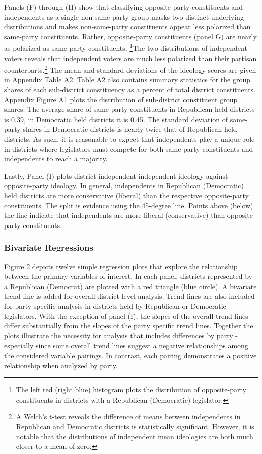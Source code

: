 \documentclass[10pt,letterpaper]{article}
\begin{document}
Panels (F) through (H) show that classifying opposite party constituents and independents as a single non-same-party group masks two distinct underlying distributions and makes non-same-party constituents appear less polarized than same-party constituents. Rather, opposite-party constituents (panel G) are nearly as polarized as same-party constituents. \footnote{The left red (right blue) histogram plots the distribution of opposite-party constituents in districts with a Republican (Democratic) legislator.}The two distributions of independent voters reveals that independent voters are much less polarized than their partisan counterparts.\footnote{A Welch's t-test reveals the difference of means between independents in Republican and Democratic districts is statistically significant. However, it is notable that the distributions of independent mean ideologies are both much closer to a mean of zero.} The mean and standard deviations of the ideology scores are given in Appendix Table A2. Table A2 also contains summary statistics for the group shares of each sub-district constituency as a percent of total district constituents. Appendix Figure A1 plots the distribution of sub-district constituent group shares. The average share of same-party constituents in Republican held districts is 0.39, in Democratic held districts it is 0.45. The standard deviation of same-party shares in Democratic districts is nearly twice that of Republican held districts. As such, it is reasonable to expect that independents play a unique role in districts where legislators must compete for both same-party constituents and independents to reach a majority.

Lastly, Panel (I) plots district independent independent ideology against opposite-party ideology. In general, independents in Republican (Democratic) held districts are more conservative (liberal) than the respective opposite-party constituents. The split is evidence using the 45-degree line. Points above (below) the line indicate that independents are more liberal (conservative) than opposite-party constituents.

\subsubsection{Bivariate Regressions}
Figure 2 depicts twelve simple regression plots that explore the relationship between the primary variables of interest. In each panel, districts represented by a Republican (Democrat) are plotted with a red triangle (blue circle). A bivariate trend line is added for overall district level analysis. Trend lines are also included for party specific analysis in districts held by Republican or Democratic legislators. With the exception of panel (I), the slopes of the overall trend lines differ substantially from the slopes of the party specific trend lines. Together the plots illustrate the necessity for analysis that includes differences by party - especially since some overall trend lines suggest a negative relationships among the considered variable pairings. In contrast, each pairing demonstrates a positive relationship when analyzed by party.
\end{document}
